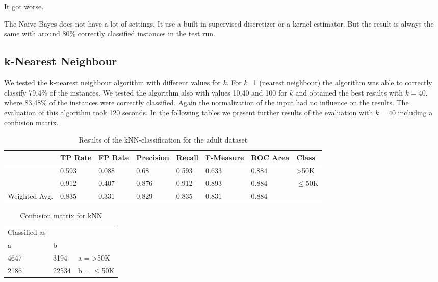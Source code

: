 \documentclass[paper=a4, fontsize=11pt]{scrartcl} %
\numberwithin{equation}{section} %
\numberwithin{figure}{section} %
\numberwithin{table}{section} %
\begin{document}
It got worse. 

The Naive Bayes does not have a lot of settings. It use a built in supervised discretizer or a kernel estimator. But the result is always the same with around 80\% correctly classified instances in the test run.

\subsection{k-Nearest Neighbour}

We tested the k-nearest neighbour algorithm with different values for $k$. For $k$=1 (nearest neighbour) the algorithm was able to correctly classify 79,4\% of the instances. We tested the algorithm also with values 10,40 and 100 for $k$ and obtained the best results with $k=40$, where 83,48\% of the instances were correctly classified. Again the normalization of the input had no influence on the results. The evaluation of this algorithm took 120 seconds. In the following tables we present further results of the evaluation with $k=40$ including a confusion matrix.

\begin{table}[h]
\centering
\begin{tabular}{|llllllll|}
	\hline
									&TP Rate   &FP Rate   &Precision   &Recall  &F-Measure &ROC Area  	&Class\\
	\hline
									&0.593     &0.088      &0.68      &0.593     &0.633    &0.884    		&>50K\\
									&0.912     &0.407      &0.876     &0.912     &0.893    &0.884    		&$\leq$50K\\
  \hline
	Weighted Avg.   &0.835     &0.331      &0.829     &0.835     &0.831    &0.884 \\
	\hline
\end{tabular}
\caption{Results of the kNN-classification for the adult dataset}
\end{table}

\vspace{6pt}

\begin{table}[h]
\centering
\begin{tabular}{|lll|}
	\hline
	Classified as	& &\\
	a		&	b & \\
	\hline
	4647  	&3194  		&  a = >50K\\
  2186 		&22534 		&  b = $\leq$50K\\
  \hline
\end{tabular}
\caption{Confusion matrix for kNN}
\end{table}
\end{document}
